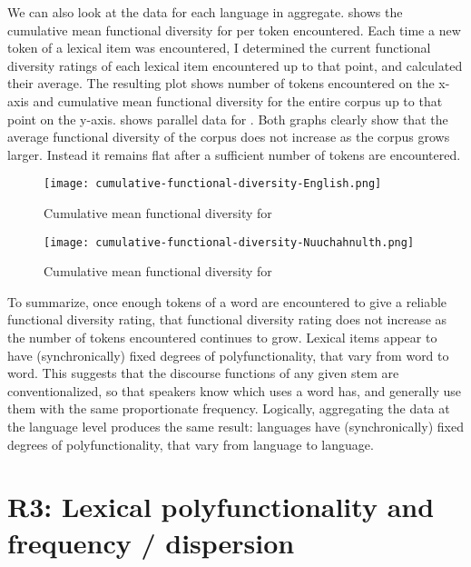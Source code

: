 We can also look at the data for each language in aggregate.  shows the cumulative mean functional diversity for  per token encountered. Each time a new token of a lexical item was encountered, I determined the current functional diversity ratings of each lexical item encountered up to that point, and calculated their average. The resulting plot shows number of tokens encountered on the x-axis and cumulative mean functional diversity for the entire corpus up to that point on the y-axis.  shows parallel data for . Both graphs clearly show that the average functional diversity of the corpus does not increase as the corpus grows larger. Instead it remains flat after a sufficient number of tokens are encountered.

\begin{figure}[h!]
  \centering
  \caption{Cumulative mean functional diversity for }
  \label{fig:cumulative-functional-diversity-English}
  \texttt{[image: cumulative-functional-diversity-English.png]}
\end{figure}

\begin{figure}[h!]
  \centering
  \caption{Cumulative mean functional diversity for }
  \label{fig:cumulative-functional-diversity-Nuuchahnulth}
  \texttt{[image: cumulative-functional-diversity-Nuuchahnulth.png]}
\end{figure}

To summarize, once enough tokens of a word are encountered to give a reliable functional diversity rating, that functional diversity rating does not increase as the number of tokens encountered continues to grow. Lexical items appear to have (synchronically) fixed degrees of polyfunctionality, that vary from word to word. This suggests that the discourse functions of any given stem are conventionalized, so that speakers know which uses a word has, and generally use them with the same proportionate frequency. Logically, aggregating the data at the language level produces the same result: languages have (synchronically) fixed degrees of polyfunctionality, that vary from language to language.

\section{R3: Lexical polyfunctionality and frequency / dispersion}
\label{sec:4.5}

